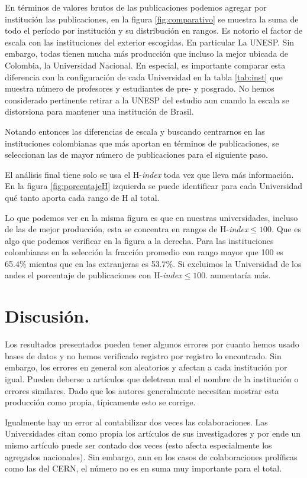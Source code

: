\documentclass[
11pt, %
letter, %
oneside, %
]{article} %
\begin{document}
En términos de valores brutos de las publicaciones podemos agregar por institución las publicaciones, en la figura \ref{fig:comparativo} se muestra la suma de todo el período por institución y su distribución en rangos. Es notorio el factor de escala con las instituciones del exterior escogidas. En particular La UNESP. Sin embargo, todas tienen mucha más producción que incluso la mejor ubicada de Colombia, la Universidad Nacional. En especial, es importante comparar esta diferencia con la configuración de cada Universidad en la tabla \ref{tab:inst} que muestra número de profesores y estudiantes de pre- y posgrado. No hemos considerado pertinente retirar a la UNESP del estudio aun cuando la escala se distorsiona para mantener una institución de Brasil. 

Notando entonces las diferencias de escala y buscando centrarnos en las instituciones colombianas que más aportan en términos de publicaciones, se seleccionan las de mayor número de publicaciones para el siguiente paso.

El análisis final tiene solo se usa el H-\textit{index} toda vez que lleva más información. En la figura \ref{fig:porcentajeH} izquierda se puede identificar para cada Universidad qué tanto aporta cada rango de H al total. 

Lo que podemos ver en la misma figura es que en nuestras universidades, incluso de las de mejor producción, esta se concentra en rangos de H-\textit{index}$\leq 100.$ Que es algo que podemos verificar en la figura a la derecha. Para las instituciones colombianas en la selección la fracción promedio con rango mayor que 100 es 65.4\% mientas que en las extranjeras es 53.7\%. Si excluimos la Universidad de los andes el porcentaje de publicaciones con  H-\textit{index}$\leq 100.$ aumentaría más. 


\section{Discusión.}

Los resultados presentados pueden tener algunos errores por cuanto hemos usado bases de datos y no hemos verificado registro por registro lo encontrado. Sin embargo, los errores en general son aleatorios y afectan a cada institución por igual. Pueden deberse a artículos que deletrean mal el nombre de la institución o errores similares. Dado que los autores generalmente necesitan mostrar esta producción como propia, típicamente esto se corrige. 

Igualmente hay un error al contabilizar dos veces las colaboraciones. Las Universidades citan como propia los artículos de sus investigadores y por ende un mismo artículo puede ser contado dos veces (esto afecta especialmente los agregados nacionales). Sin embargo, aun en los casos de colaboraciones prolíficas como las del CERN, el número no es en suma muy importante para el total. 
\end{document}
